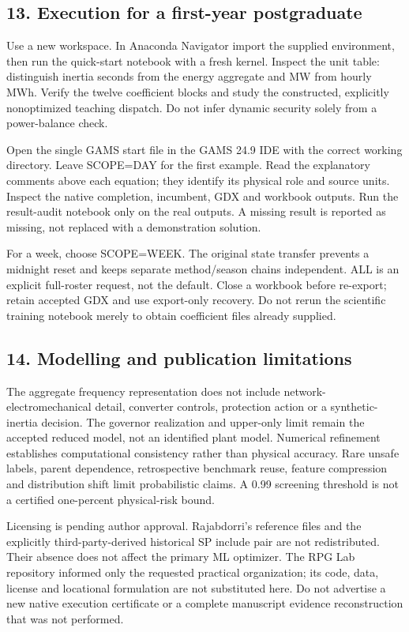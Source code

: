 \documentclass[
  11pt,
  a4paper,
]{article}
\begin{document}
\subsection{13. Execution for a first-year
postgraduate}\label{execution-for-a-first-year-postgraduate}

Use a new workspace. In Anaconda Navigator import the supplied
environment, then run the quick-start notebook with a fresh kernel.
Inspect the unit table: distinguish inertia seconds from the energy
aggregate and MW from hourly MWh. Verify the twelve coefficient blocks
and study the constructed, explicitly nonoptimized teaching dispatch. Do
not infer dynamic security solely from a power-balance check.

Open the single GAMS start file in the GAMS 24.9 IDE with the correct
working directory. Leave SCOPE=DAY for the first example. Read the
explanatory comments above each equation; they identify its physical
role and source units. Inspect the native completion, incumbent, GDX and
workbook outputs. Run the result-audit notebook only on the real
outputs. A missing result is reported as missing, not replaced with a
demonstration solution.

For a week, choose SCOPE=WEEK. The original state transfer prevents a
midnight reset and keeps separate method/season chains independent. ALL
is an explicit full-roster request, not the default. Close a workbook
before re-export; retain accepted GDX and use export-only recovery. Do
not rerun the scientific training notebook merely to obtain coefficient
files already supplied.

\subsection{14. Modelling and publication
limitations}\label{modelling-and-publication-limitations}

The aggregate frequency representation does not include
network-electromechanical detail, converter controls, protection action
or a synthetic-inertia decision. The governor realization and upper-only
limit remain the accepted reduced model, not an identified plant model.
Numerical refinement establishes computational consistency rather than
physical accuracy. Rare unsafe labels, parent dependence, retrospective
benchmark reuse, feature compression and distribution shift limit
probabilistic claims. A 0.99 screening threshold is not a certified
one-percent physical-risk bound.

Licensing is pending author approval. Rajabdorri's reference files and
the explicitly third-party-derived historical SP include pair are not
redistributed. Their absence does not affect the primary ML optimizer.
The RPG Lab repository informed only the requested practical
organization; its code, data, license and locational formulation are not
substituted here. Do not advertise a new native execution certificate or
a complete manuscript evidence reconstruction that was not performed.
\end{document}
